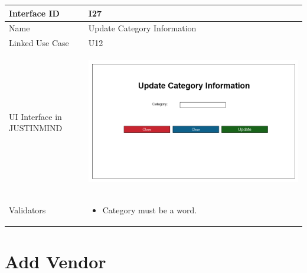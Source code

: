 \documentclass[12pt,a4paper]{report}
\begin{document}
\begin{tabular}{ | m{3cm} | m{12cm}| } \hline

Interface ID & I27  \\\hline

Name  &  Update Category Information \\ \hline

Linked Use Case & U12	 \\ \hline

UI Interface in JUSTINMIND & \begin{center} \includegraphics[scale=0.3]{./User Interface/UI-026Update Category Inofrmation@1x.png}\end{center}  \\ \hline

Validators & 
\begin{itemize}
\item   Category must be a word.
\end{itemize}
\\ \hline
\end{tabular}
\section{Add Vendor}
\end{document}
